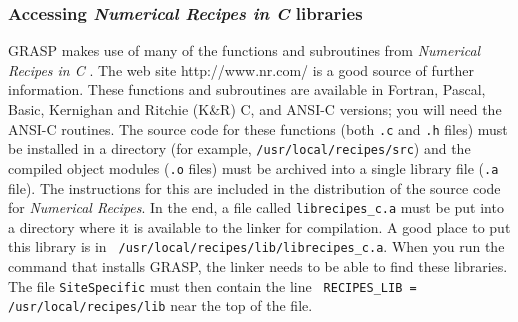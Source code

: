 \subsubsection{Accessing {\it Numerical Recipes in C} libraries}
GRASP makes use of many of the functions and subroutines from {\it
Numerical Recipes in C} \cite{NumRec}.
The web site 
{http://www.nr.com/} is a good source of further information.
These functions and subroutines
are available in Fortran, Pascal, Basic, Kernighan and Ritchie (K\&R)
C, and ANSI-C versions; you will need the ANSI-C routines.  The source
code for these functions (both {\tt *.c} and {\tt *.h} files) must be
installed in a directory (for example, \mbox{\tt /usr/local/recipes/src})
and the compiled object modules ({\tt *.o} files) must be archived into
a single library file ({\tt *.a} file).  The instructions for this are
included in the distribution of the source code for {\it Numerical
Recipes}.   In the end, a file called {\tt librecipes\_c.a} must be put
into a directory where it is available to the linker for compilation.
A good place to put this library is in \mbox{\tt
/usr/local/recipes/lib/librecipes\_c.a}.  When you run the command that
installs GRASP, the linker needs to be able to find these libraries.
The file {\tt SiteSpecific} must then contain the line \mbox{\tt
RECIPES\_LIB = /usr/local/recipes/lib} near the top of the file.

